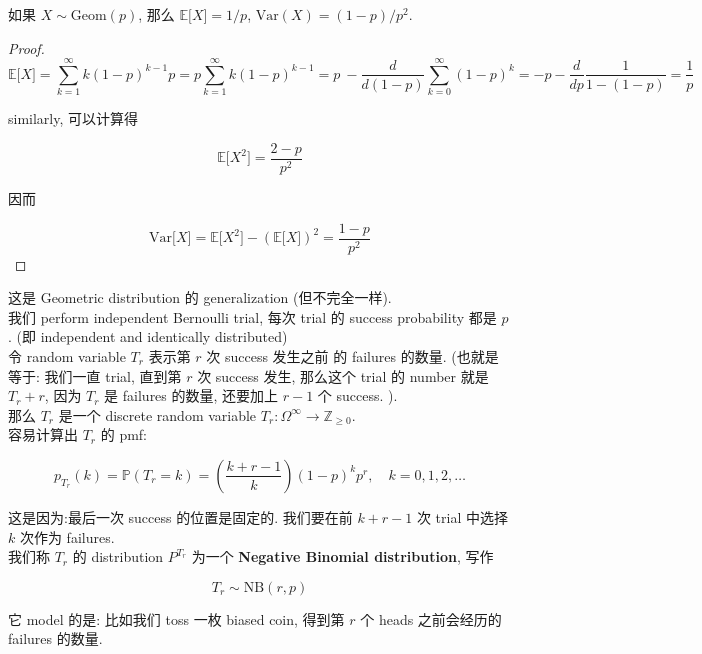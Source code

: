 \documentclass{qlnotes-export}
\begin{document}
\begin{proposition}

如果 \(X \sim \text{Geom}(p)\), 那么 \({\mathbb{E}}\lbrack X\rbrack = 1/p\), \(\text{Var}(X) = (1 - p)/p^{2}\).

\end{proposition}

\begin{proof}

\[{\mathbb{E}}\lbrack X\rbrack = \sum\limits_{k = 1}^{\infty}k(1 - p)^{k - 1}p = p\sum\limits_{k = 1}^{\infty}k(1 - p)^{k - 1} = p\  - \frac{d}{d(1 - p)}\sum\limits_{k = 0}^{\infty}(1 - p)^{k} = - p - \frac{d}{dp}\frac{1}{1 - (1 - p)} = \frac{1}{p}\]

similarly, 可以计算得

\[{\mathbb{E}}\lbrack X^{2}\rbrack = \frac{2 - p}{p^{2}}\]

因而

\[\text{Var}\lbrack X\rbrack = {\mathbb{E}}\lbrack X^{2}\rbrack - ({\mathbb{E}}\lbrack X\rbrack)^{2} = \frac{1 - p}{p^{2}}\]

\end{proof}

\begin{example}

这是 Geometric distribution 的 generalization (但不完全一样).\\
我们 perform independent Bernoulli trial, 每次 trial 的 success probability 都是 \(p\). (即 independent and identically distributed)\\
令 random variable \(T_{r}\) 表示第 \(r\) 次 success 发生之前 的 failures 的数量. (也就是等于: 我们一直 trial, 直到第 \(r\) 次 success 发生, 那么这个 trial 的 number 就是 \(T_{r} + r\), 因为 \(T_{r}\) 是 failures 的数量, 还要加上 \(r - 1\) 个 success. ).\\
那么 \(T_{r}\) 是一个 discrete random variable \(T_{r}:\Omega^{\infty}\rightarrow{\mathbb{Z}}_{\geq 0}\).\\
容易计算出 \(T_{r}\) 的 pmf:

\[p_{T_{r}}(k) = {\mathbb{P}}(T_{r} = k) = \left( \frac{k + r - 1}{k} \right)(1 - p)^{k}p^{r},\quad k = 0,1,2,\ldots\]

这是因为:最后一次 success 的位置是固定的. 我们要在前 \(k + r - 1\) 次 trial 中选择 \(k\) 次作为 failures.\\
我们称 \(T_{r}\) 的 distribution \(P^{T_{r}}\) 为一个 \textbf{Negative Binomial distribution}, 写作

\[T_{r} \sim \text{NB}(r,p)\]

它 model 的是: 比如我们 toss 一枚 biased coin, 得到第 \(r\) 个 heads 之前会经历的 failures 的数量.\\

\end{example}
\end{document}
